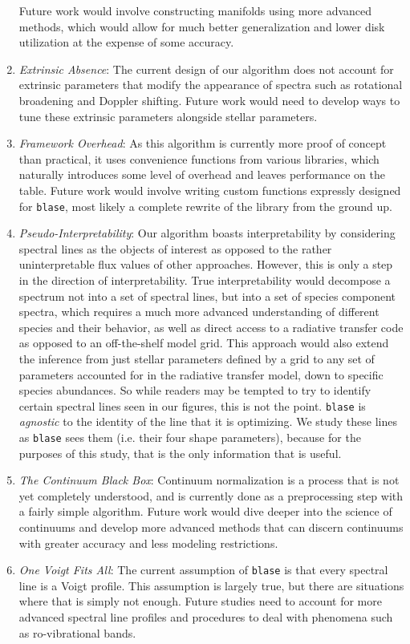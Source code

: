 \documentclass[twocolumn]{aastex631}
\begin{document}
\begin{enumerate}[label=-]
    Future work would involve constructing manifolds using more advanced methods, which would allow for much better generalization and lower disk utilization at the expense of some accuracy.
    \item \textit{Extrinsic Absence}: The current design of our algorithm does not account for extrinsic parameters that modify the appearance of spectra such as rotational broadening and Doppler shifting. 
    Future work would need to develop ways to tune these extrinsic parameters alongside stellar parameters.
    \item \textit{Framework Overhead}: As this algorithm is currently more proof of concept than practical, it uses convenience functions from various libraries, which naturally introduces some level of overhead and leaves performance on the table. 
    Future work would involve writing custom functions expressly designed for \texttt{blase}, most likely a complete rewrite of the library from the ground up.
    \item \textit{Pseudo-Interpretability}: Our algorithm boasts interpretability by considering spectral lines as the objects of interest as opposed to the rather uninterpretable flux values of other approaches. 
    However, this is only a step in the direction of interpretability. 
    True interpretability would decompose a spectrum not into a set of spectral lines, but into a set of species component spectra, which requires a much more advanced understanding of different species and their behavior, as well as direct access to a radiative transfer code as opposed to an off-the-shelf model grid. 
    This approach would also extend the inference from just stellar parameters defined by a grid to any set of parameters accounted for in the radiative transfer model, down to specific species abundances. 
    So while readers may be tempted to try to identify certain spectral lines seen in our figures, this is not the point. 
    \texttt{blase} is \textit{agnostic} to the identity of the line that it is optimizing. 
    We study these lines as \texttt{blase} sees them (i.e. their four shape parameters), because for the purposes of this study, that is the only information that is useful.
    \item \textit{The Continuum Black Box}: Continuum normalization is a process that is not yet completely understood, and is currently done as a preprocessing step with a fairly simple algorithm. 
    Future work would dive deeper into the science of continuums and develop more advanced methods that can discern continuums with greater accuracy and less modeling restrictions.
    \item \textit{One Voigt Fits All}: The current assumption of \texttt{blase} is that every spectral line is a Voigt profile. 
    This assumption is largely true, but there are situations where that is simply not enough. 
    Future studies need to account for more advanced spectral line profiles and procedures to deal with phenomena such as ro-vibrational bands.
\end{enumerate}
\end{document}

